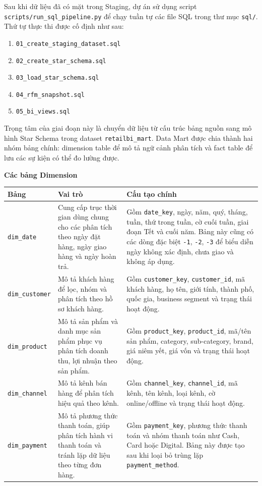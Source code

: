 \documentclass[12pt,a4paper]{article}
\newcommand{\code}[1]{\texttt{#1}}
\begin{document}
Sau khi dữ liệu đã có mặt trong Staging, dự án sử dụng script \code{scripts/run\_sql\_pipeline.py} để chạy tuần tự các file SQL trong thư mục \code{sql/}. Thứ tự thực thi được cố định như sau:

\begin{enumerate}
    \item \code{01\_create\_staging\_dataset.sql}
    \item \code{02\_create\_star\_schema.sql}
    \item \code{03\_load\_star\_schema.sql}
    \item \code{04\_rfm\_snapshot.sql}
    \item \code{05\_bi\_views.sql}
\end{enumerate}

Trọng tâm của giai đoạn này là chuyển dữ liệu từ cấu trúc bảng nguồn sang mô hình Star Schema trong dataset \code{retailbi\_mart}. Data Mart được chia thành hai nhóm bảng chính: dimension table để mô tả ngữ cảnh phân tích và fact table để lưu các sự kiện có thể đo lường được.

\textbf{Các bảng Dimension}

\begin{table}[H]
\centering
\footnotesize
\begin{tabularx}{\textwidth}{|p{}|Y|Y|}
\hline
\textbf{Bảng} & \textbf{Vai trò} & \textbf{Cấu tạo chính} \\
\hline
\code{dim\_date} & Cung cấp trục thời gian dùng chung cho các phân tích theo ngày đặt hàng, ngày giao hàng và ngày hoàn trả. & Gồm \code{date\_key}, ngày, năm, quý, tháng, tuần, thứ trong tuần, cờ cuối tuần, giai đoạn Tết và cuối năm. Bảng này cũng có các dòng đặc biệt \code{-1}, \code{-2}, \code{-3} để biểu diễn ngày không xác định, chưa giao và không áp dụng. \\
\hline
\code{dim\_customer} & Mô tả khách hàng để lọc, nhóm và phân tích theo hồ sơ khách hàng. & Gồm \code{customer\_key}, \code{customer\_id}, mã khách hàng, họ tên, giới tính, thành phố, quốc gia, business segment và trạng thái hoạt động. \\
\hline
\code{dim\_product} & Mô tả sản phẩm và danh mục sản phẩm phục vụ phân tích doanh thu, lợi nhuận theo sản phẩm. & Gồm \code{product\_key}, \code{product\_id}, mã/tên sản phẩm, category, sub-category, brand, giá niêm yết, giá vốn và trạng thái hoạt động. \\
\hline
\code{dim\_channel} & Mô tả kênh bán hàng để phân tích hiệu quả theo kênh. & Gồm \code{channel\_key}, \code{channel\_id}, mã kênh, tên kênh, loại kênh, cờ online/offline và trạng thái hoạt động. \\
\hline
\code{dim\_payment} & Mô tả phương thức thanh toán, giúp phân tích hành vi thanh toán và tránh lặp dữ liệu theo từng đơn hàng. & Gồm \code{payment\_key}, phương thức thanh toán và nhóm thanh toán như Cash, Card hoặc Digital. Bảng này được tạo sau khi loại bỏ trùng lặp \code{payment\_method}. \\
\hline
\end{tabularx}
\end{table}
\end{document}
